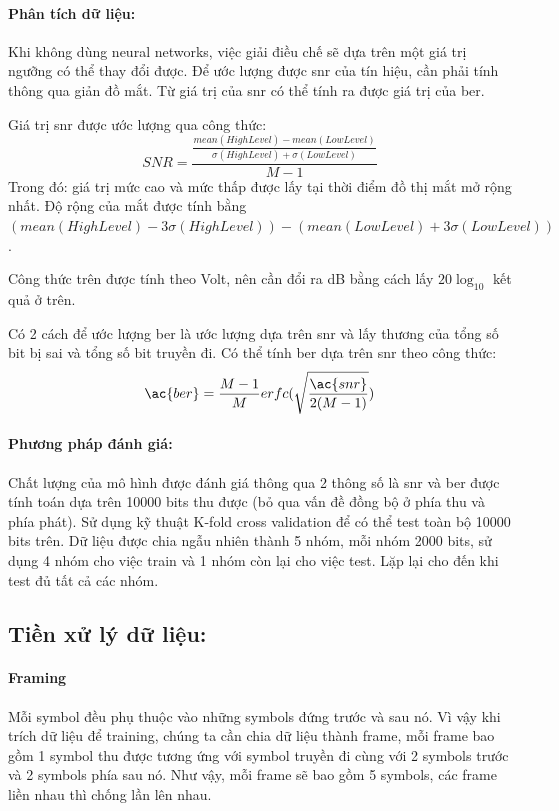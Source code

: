 \paragraph{Phân tích dữ liệu:}

Khi không dùng neural networks, việc giải điều chế sẽ dựa trên một giá trị ngưỡng có thể thay đổi được. Để ước lượng được \ac{snr} của tín hiệu, cần phải tính thông qua giản đồ mắt. Từ giá trị của \ac{snr} có thể tính ra được giá trị của \ac{ber}.

Giá trị \ac{snr} được ước lượng qua công thức:
\begin{equation}
SNR  = \frac {\frac{mean(HighLevel) - mean (LowLevel)}{\sigma(HighLevel) + \sigma(LowLevel)}}{M-1}
\end{equation}
Trong đó: giá trị mức cao và mức thấp được lấy tại thời điểm đồ thị mắt mở rộng nhất. Độ rộng của mắt được tính bằng $(mean(HighLevel) - 3\sigma(HighLevel)) - (mean(LowLevel) + 3\sigma(LowLevel)) $. 

Công thức trên được tính theo Volt, nên cần đổi ra dB bằng cách lấy $20\log_{10}$ kết quả ở trên. 

Có 2 cách để ước lượng \ac{ber} là ước lượng dựa trên \ac{snr} và lấy thương của tổng số bit bị sai và tổng số bit truyền đi. Có thể tính \ac{ber} dựa trên \ac{snr} theo công thức: \cite{Apena_2018}
\begin{equation}
\ac{ber} = \frac{M-1}{M} erfc({\sqrt{\frac{\ac{snr}}{2(M-1)}}})
\end{equation}

\paragraph{Phương pháp đánh giá:} Chất lượng của mô hình được đánh giá thông qua 2 thông số là \ac{snr} và \ac{ber} được tính toán dựa trên 10000 bits thu được (bỏ qua vấn đề đồng bộ ở phía thu và phía phát). Sử dụng kỹ thuật K-fold cross validation để có thể test toàn bộ 10000 bits trên. Dữ liệu được chia ngẫu nhiên thành 5 nhóm, mỗi nhóm 2000 bits, sử dụng 4 nhóm cho việc train và 1 nhóm còn lại cho việc test. Lặp lại cho đến khi test đủ tất cả các nhóm.  

\subsection{Tiền xử lý dữ liệu:}
\paragraph{Framing}
Mỗi symbol đều phụ thuộc vào những symbols đứng trước và sau nó. Vì vậy khi trích dữ liệu để training, chúng ta cần chia dữ liệu thành frame, mỗi frame bao gồm 1 symbol thu được tương ứng với symbol truyền đi cùng với 2 symbols trước và 2 symbols phía sau nó. Như vậy, mỗi frame sẽ bao gồm 5 symbols, các frame liền nhau thì chống lần lên nhau.

